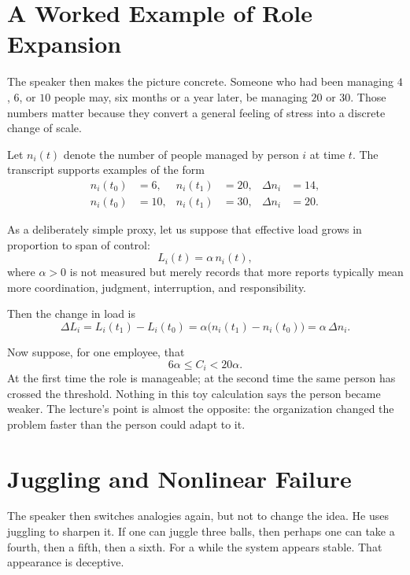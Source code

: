 \section{A Worked Example of Role Expansion}

The speaker then makes the picture concrete. Someone who had been managing \(4\), \(6\), or \(10\) people may, six months or a year later, be managing \(20\) or \(30\). Those numbers matter because they convert a general feeling of stress into a discrete change of scale.

Let \(n_i(t)\) denote the number of people managed by person \(i\) at time \(t\). The transcript supports examples of the form
\begin{align}
n_i(t_0) &= 6,  & n_i(t_1) &= 20,  & \Delta n_i &= 14, \\
n_i(t_0) &= 10, & n_i(t_1) &= 30,  & \Delta n_i &= 20.
\end{align}

As a deliberately simple proxy, let us suppose that effective load grows in proportion to span of control:
\begin{equation}
L_i(t) = \alpha\, n_i(t),
\end{equation}
where \(\alpha > 0\) is not measured but merely records that more reports typically mean more coordination, judgment, interruption, and responsibility.

Then the change in load is
\begin{equation}
\Delta L_i = L_i(t_1)-L_i(t_0)=\alpha\bigl(n_i(t_1)-n_i(t_0)\bigr)=\alpha\,\Delta n_i.
\end{equation}

Now suppose, for one employee, that
\begin{equation}
6\alpha \le C_i < 20\alpha.
\end{equation}
At the first time the role is manageable; at the second time the same person has crossed the threshold. Nothing in this toy calculation says the person became weaker. The lecture's point is almost the opposite: the organization changed the problem faster than the person could adapt to it.

\section{Juggling and Nonlinear Failure}

The speaker then switches analogies again, but not to change the idea. He uses juggling to sharpen it. If one can juggle three balls, then perhaps one can take a fourth, then a fifth, then a sixth. For a while the system appears stable. That appearance is deceptive.


